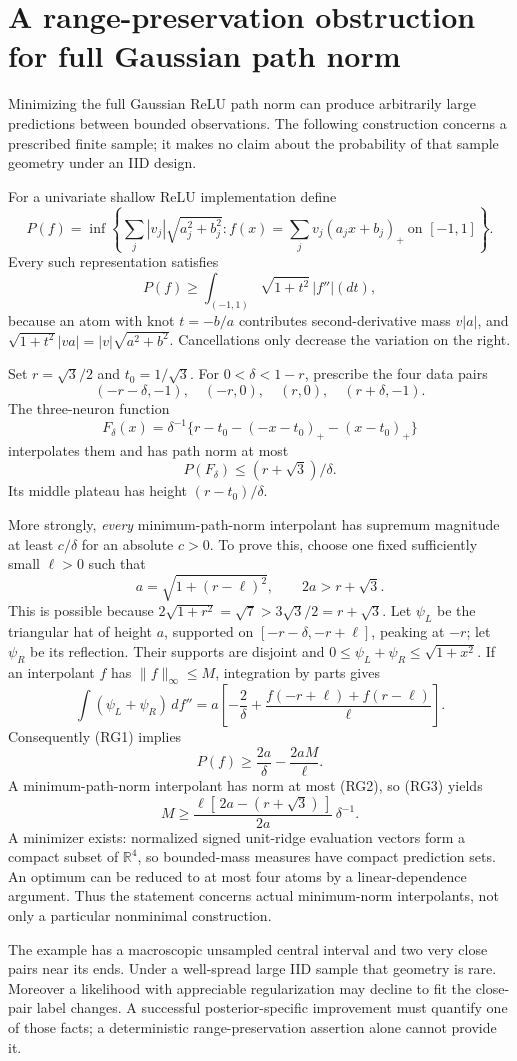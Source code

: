 \section{A range-preservation obstruction for full Gaussian path norm}
Minimizing the full Gaussian ReLU path norm can produce arbitrarily
large predictions between bounded observations. The following
construction concerns a prescribed finite sample; it makes no claim
about the probability of that sample geometry under an IID design.

For a univariate shallow ReLU implementation define
\[
 P(f)=\inf\left\{\sum_j|v_j|\sqrt{a_j^2+b_j^2}:
          f(x)=\sum_jv_j(a_jx+b_j)_+\ \text{on }[-1,1]\right\}.
\]
Every such representation satisfies
\[
 P(f)\ge\int_{(-1,1)}\sqrt{1+t^2}\,|f''|(dt), \tag{RG1}
\]
because an atom with knot $t=-b/a$ contributes second-derivative
mass $v|a|$, and
$\sqrt{1+t^2}|v a|=|v|\sqrt{a^2+b^2}$.
Cancellations only decrease the variation on the right.

Set $r=\sqrt3/2$ and $t_0=1/\sqrt3$. For
$0<\delta<1-r$, prescribe the four data pairs
\[
 (-r-\delta,-1),\quad(-r,0),\quad(r,0),\quad(r+\delta,-1).
\]
The three-neuron function
\[
 F_\delta(x)=\delta^{-1}
 \{r-t_0-(-x-t_0)_+-(x-t_0)_+\}
\]
interpolates them and has path norm at most
\[
 P(F_\delta)\le (r+\sqrt3)/\delta. \tag{RG2}
\]
Its middle plateau has height $(r-t_0)/\delta$.

More strongly, \emph{every} minimum-path-norm interpolant has
supremum magnitude at least $c/\delta$ for an absolute $c>0$.
To prove this, choose one fixed sufficiently small $\ell>0$ such that
\[
 a=\sqrt{1+(r-\ell)^2},\qquad 2a>r+\sqrt3.
\]
This is possible because
$2\sqrt{1+r^2}=\sqrt7>3\sqrt3/2=r+\sqrt3$.
Let $\psi_L$ be the triangular hat of height $a$, supported on
$[-r-\delta,-r+\ell]$, peaking at $-r$; let $\psi_R$ be its reflection.
Their supports are disjoint and
$0\le\psi_L+\psi_R\le\sqrt{1+x^2}$.
If an interpolant $f$ has $\|f\|_\infty\le M$, integration by parts gives
\[
 \int(\psi_L+\psi_R)\,df''
 =a\left[-\frac2\delta+
   \frac{f(-r+\ell)+f(r-\ell)}{\ell}\right].
\]
Consequently (RG1) implies
\[
 P(f)\ge \frac{2a}{\delta}-\frac{2aM}{\ell}. \tag{RG3}
\]
A minimum-path-norm interpolant has norm at most (RG2), so (RG3) yields
\[
 M\ge
 \frac{\ell[\,2a-(r+\sqrt3)\,]}{2a}\,\delta^{-1}.
\]
A minimizer exists: normalized signed unit-ridge evaluation vectors
form a compact subset of $\mathbb R^4$, so bounded-mass measures
have compact prediction sets. An optimum can be reduced to at most
four atoms by a linear-dependence argument.
Thus the statement concerns actual minimum-norm interpolants, not
only a particular nonminimal construction.

The example has a macroscopic unsampled central interval and two
very close pairs near its ends. Under a well-spread large IID sample
that geometry is rare. Moreover a likelihood with appreciable
regularization may decline to fit the close-pair label changes.
A successful posterior-specific improvement must quantify one of
those facts; a deterministic range-preservation assertion alone
cannot provide it.
